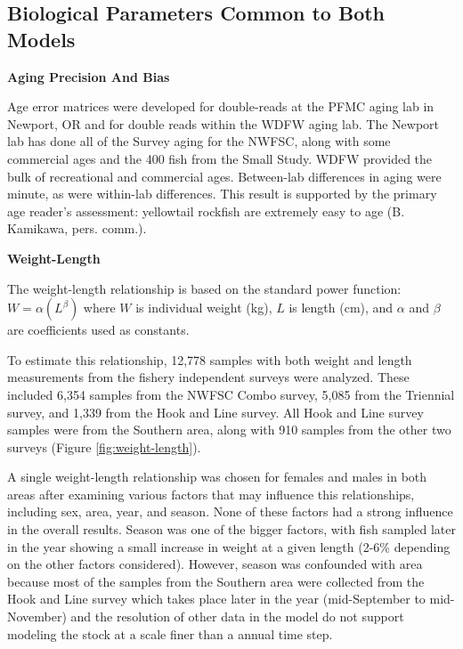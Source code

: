 \documentclass[12pt,]{article}
\begin{document}
\clearpage

\subsection{\texorpdfstring{Biological Parameters Common to Both Models
\label{bio-params}}{Biological Parameters Common to Both Models }}\label{biological-parameters-common-to-both-models}

\vspace{.5cm}

\textbf{Aging Precision And Bias}

Age error matrices were developed for double-reads at the PFMC aging lab
in Newport, OR and for double reads within the WDFW aging lab. The
Newport lab has done all of the Survey aging for the NWFSC, along with
some commercial ages and the 400 fish from the Small Study. WDFW
provided the bulk of recreational and commercial ages. Between-lab
differences in aging were minute, as were within-lab differences. This
result is supported by the primary age reader's assessment: yellowtail
rockfish are extremely easy to age (B. Kamikawa, pers. comm.).

\vspace{.5cm}

\textbf{Weight-Length}

The weight-length relationship is based on the standard power function:
\(W = \alpha(L^\beta)\) where \(W\) is individual weight (kg), \(L\) is
length (cm), and \(\alpha\) and \(\beta\) are coefficients used as
constants.

To estimate this relationship, 12,778 samples with both weight and
length measurements from the fishery independent surveys were analyzed.
These included 6,354 samples from the NWFSC Combo survey, 5,085 from the
Triennial survey, and 1,339 from the Hook and Line survey. All Hook and
Line survey samples were from the Southern area, along with 910 samples
from the other two surveys (Figure \ref{fig:weight-length}).

A single weight-length relationship was chosen for females and males in
both areas after examining various factors that may influence this
relationships, including sex, area, year, and season. None of these
factors had a strong influence in the overall results. Season was one of
the bigger factors, with fish sampled later in the year showing a small
increase in weight at a given length (2-6\% depending on the other
factors considered). However, season was confounded with area because
most of the samples from the Southern area were collected from the Hook
and Line survey which takes place later in the year (mid-September to
mid-November) and the resolution of other data in the model do not
support modeling the stock at a scale finer than a annual time step.
\end{document}
